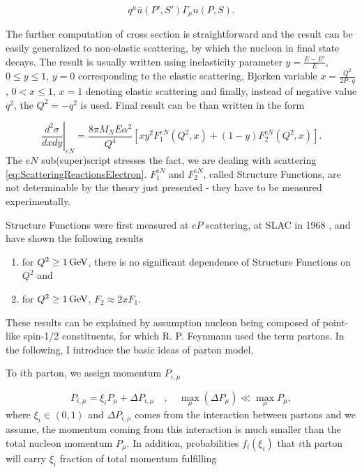 \begin{equation}
  q^\mu \bar{u}(P',S')\Gamma_\mu u(P,S).
  \label{eq:ScatteringGaugeInvariance}
\end{equation}

The further computation of cross section is straightforward and the result can
be easily generalized to non-elastic scattering, by which the nucleon in final
state decays. The result is usually written using inelasticity parameter
$y=\frac{E-E'}{E}$, $0 \leq y \leq 1$, $y=0$ corresponding to the elastic
scattering, Bjorken variable $ x = \frac{Q^2}{2 P \cdot q}$, $ 0 < x \leq 1$, $x
= 1$ denoting elastic scattering and finally, instead of negative value $q^2$, the
$Q^2 = -q^2$ is used. Final result can be than written in the form

\begin{equation}
  \left. \frac{d^2\sigma}{dxdy} \right|_{eN} =
  \frac{8 \pi M_N E \alpha^2}{Q^4} \left[ x y^2 F_1^{eN}(Q^2, x)
  + (1-y) F_2^{eN}(Q^2,x) \right].
  \label{eq:ScatteringRes1}
\end{equation}
The $eN$ sub(super)script stresses the fact, we are dealing with scattering
\eqref{eq:ScatteringReactionsElectron}. 
$F_1^{eN}$ and $F_2^{eN}$, called Structure Functions, are not determinable by
the theory just presented - they have to be measured experimentally.

Structure Functions were first measured at $eP$ scattering, at SLAC in 1968
\cite{ePScattering}, and have shown the following results
\begin{enumerate}
  \item for $Q^2 \geq 1\,\text{GeV}$, there is no significant dependence of Structure
    Functions on $Q^2$ and
  \item for $Q^2 \geq 1\,\text{GeV}$, $F_2 \approx 2xF_1$.
\end{enumerate}
These results can be explained by assumption nucleon being composed of
point-like spin-1/2 constituents, for which R. P. Feynmann used the term
partons. In the following, I introduce the basic ideas of parton model. 

To $i$th parton, we assign momentum $P_{i,\mu}$

\begin{equation}
  P_{i,\mu} = \xi_i P_\mu + \Delta P_{i,\mu} 
    \quad , \quad \max_\mu (\Delta P_\mu) \ll \max_\mu P_\mu,
  \label{PartonsMomentumDistriburtionAssumption}
\end{equation}
where $\xi_i \in \left< 0, 1 \right>$ and $\Delta P_{i,\mu}$ comes from the
interaction between partons and we assume, the momentum coming from this
interaction is much smaller than the total nucleon momentum $P_\mu$. In
addition, probabilities $f_i(\xi_i)$ that $i$th parton will carry $\xi_i$
fraction of total momentum fulfilling

